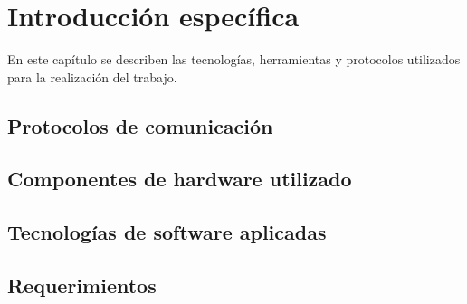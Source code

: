 \chapter{Introducción específica} %

\label{Chapter2}

En este capítulo se describen las tecnologías, herramientas y protocolos utilizados para la realización del trabajo.

\section{Protocolos de comunicación}
\label{sec:Protocolos de comunicación}

\section{Componentes de hardware utilizado}
\label{sec:Hardware utilizado}

\section{Tecnologías de software aplicadas}
\label{sec:Software aplicado}

\section{Requerimientos}
\label{sec:Requerimientos}

